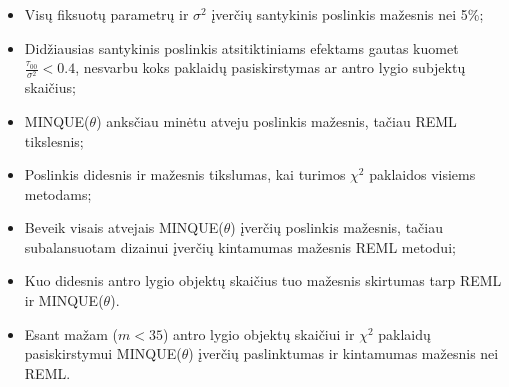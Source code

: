 \documentclass[12pt,a4paper]{article}
\begin{document}
\begin{itemize}
\item Visų fiksuotų parametrų ir $\sigma^2$ įverčių santykinis poslinkis mažesnis nei 5\%;
\item Didžiausias santykinis poslinkis atsitiktiniams efektams gautas kuomet $\frac{\tau_{00}}{\sigma^2}<0.4$, nesvarbu koks paklaidų pasiskirstymas ar antro lygio subjektų skaičius;
\item MINQUE($\theta$) anksčiau minėtu atveju poslinkis mažesnis, tačiau REML tikslesnis;
\item Poslinkis didesnis ir mažesnis tikslumas, kai turimos $\chi^2$ paklaidos visiems metodams;
\item Beveik visais atvejais MINQUE($\theta$) įverčių poslinkis mažesnis, tačiau subalansuotam dizainui įverčių kintamumas mažesnis REML metodui;
\item Kuo didesnis antro lygio objektų skaičius tuo mažesnis skirtumas tarp REML ir MINQUE($\theta$).
\item Esant mažam ($m < 35$) antro lygio objektų skaičiui ir $\chi^2$ paklaidų pasiskirstymui MINQUE($\theta$) įverčių paslinktumas ir kintamumas mažesnis nei REML.
\end{itemize}
\end{document}
